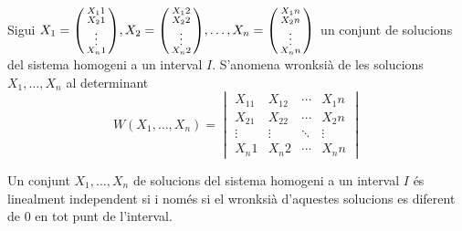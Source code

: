 \documentclass[../main.tex]{subfiles}
\begin{document}
\begin{definicio}
Sigui $X_1 = \begin{psmallmatrix}X_11\\X_21\\\vdots\\X_n1\end{psmallmatrix}, X_2 = \begin{psmallmatrix}X_12\\X_22\\\vdots\\X_n2\end{psmallmatrix}, \dots, X_n = \begin{psmallmatrix}X_1n\\X_2n\\\vdots\\X_nn\end{psmallmatrix}$ un conjunt de solucions del sistema homogeni a un interval $I$. S'anomena wronksià de les solucions $X_1, \dots, X_n$ al determinant
\begin{displaymath}
 W(X_1, \dots, X_n) = \begin{vmatrix}
 X_11 & X_12 & \cdots & X_1n\\
 X_21 & X_22 & \cdots & X_2n\\
 \vdots & \vdots & \ddots & \vdots\\
 X_n1 & X_n2 & \cdots & X_nn
 \end{vmatrix}
\end{displaymath}
\end{definicio}
\begin{proposicio}
Un conjunt $X_1, \dots, X_n$ de solucions del sistema homogeni a un interval $I$ és linealment independent si i només si el wronksià d'aquestes solucions es diferent de 0 en tot punt de l'interval.
\end{proposicio}
\end{document}
